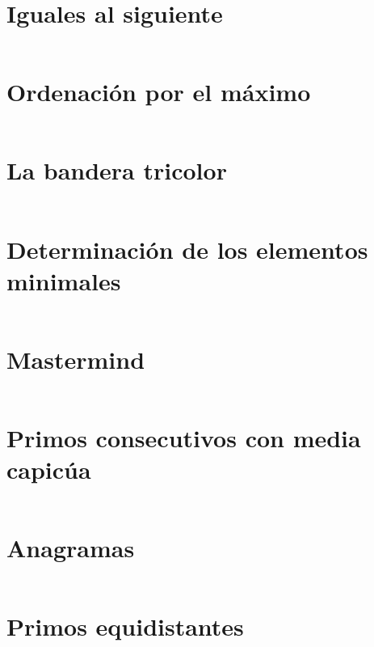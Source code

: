 \documentclass[a4paper,12pt,twoside]{book}
\newcommand{\ejercicio}[1]{\inputminted[firstline=7]{haskell}{../src/#1.hs}}
\begin{document}

\chapter{Iguales al siguiente}
\ejercicio{Iguales_al_siguiente}

\chapter{Ordenación por el máximo}
\ejercicio{Ordenados_por_maximo}

\chapter{La bandera tricolor}
\ejercicio{Bandera_tricolor}

\chapter{Determinación de los elementos minimales}
\ejercicio{ElementosMinimales}

\chapter{Mastermind}
\ejercicio{Mastermind}

\chapter{Primos consecutivos con media capicúa}
\ejercicio{Primos_consecutivos_con_media_capicua}

\chapter{Anagramas}
\ejercicio{Anagramas}

\chapter{Primos equidistantes}
\ejercicio{Primos_equidistantes}

\end{document}
